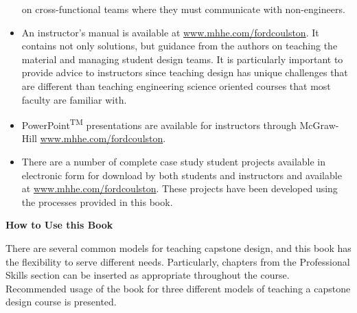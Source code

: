 \begin{itemize}
  on cross-functional teams where they must communicate with
  non-engineers.
\item
  An instructor's manual is available at
  \href{http://www.mhhe.com/fordcoulston}{www.mhhe.com/fordcoulston}. It
  contains not only solutions, but guidance from the authors on teaching
  the material and managing student design teams. It is particularly
  important to provide advice to instructors since teaching design has
  unique challenges that are different than teaching engineering science
  oriented courses that most faculty are familiar with.
\item
  PowerPoint\textsuperscript{TM} presentations are available for
  instructors through McGraw-Hill
  \href{http://www.mhhe.com/fordcoulston}{www.mhhe.com/fordcoulston}.
\item
  There are a number of complete case study student projects available
  in electronic form for download by both students and instructors and
  available at
  \href{http://www.mhhe.com/fordcoulston}{www.mhhe.com/fordcoulston}.
  These projects have been developed using the processes provided in
  this book.
\end{itemize}

\textbf{How to Use this Book}

There are several common models for teaching capstone design, and this
book has the flexibility to serve different needs. Particularly,
chapters from the Professional Skills section can be inserted as
appropriate throughout the course. Recommended usage of the book for
three different models of teaching a capstone design course is
presented.

